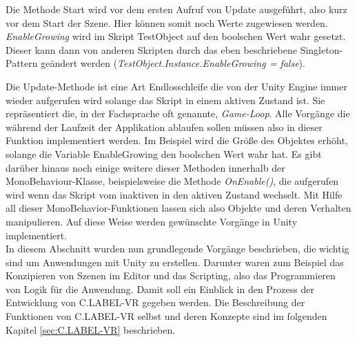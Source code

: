 Die Methode Start wird vor dem ersten Aufruf von Update ausgeführt, also kurz vor dem Start der Szene. Hier können somit noch Werte zugewiesen werden. \textit{EnableGrowing} wird im Skript TestObject auf den boolschen Wert \glqq wahr\grqq{} gesetzt. Dieser kann dann von anderen Skripten durch das eben beschriebene Singleton-Pattern geändert werden (\textit{TestObject.Instance.EnableGrowing = false}).  

Die Update-Methode ist eine Art Endlosschleife die von der Unity Engine immer wieder aufgerufen wird solange das Skript in einem aktiven Zustand ist. Sie repräsentiert die, in der Fachsprache oft genannte, \textit{Game-Loop}. Alle Vorgänge die während der Laufzeit der Applikation ablaufen sollen müssen also in dieser Funktion implementiert werden. Im Beispiel wird die Größe des Objektes erhöht, solange die Variable EnableGrowing den boolschen Wert \glqq wahr\grqq{} hat. Es gibt darüber hinaus noch einige weitere dieser Methoden innerhalb der MonoBehaviour-Klasse, beispielsweise die Methode \textit{OnEnable()}, die aufgerufen wird wenn das Skript vom inaktiven in den aktiven Zustand wechselt. Mit Hilfe all dieser MonoBehavior-Funktionen lassen sich also Objekte und deren Verhalten manipulieren. Auf diese Weise werden gewünschte Vorgänge in Unity implementiert.\\

In diesem Abschnitt wurden nun grundlegende Vorgänge beschrieben, die wichtig sind um Anwendungen mit Unity zu erstellen. Darunter waren zum Beispiel das Konzipieren von Szenen im Editor und das Scripting, also das Programmieren von Logik für die Anwendung. Damit soll ein Einblick in den Prozess der Entwicklung von C.LABEL-VR gegeben werden. Die Beschreibung der Funktionen von C.LABEL-VR selbst und deren Konzepte sind im folgenden Kapitel \ref{sec:C.LABEL-VR} beschrieben. 






